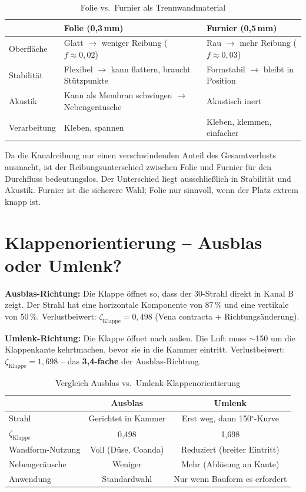 \documentclass[11pt,a4paper]{article}
\begin{document}
\begin{table}[H]
\centering\small
\begin{tabular}{l p{50mm} p{50mm}}
\toprule
& \textbf{Folie (0,3\,mm)} & \textbf{Furnier (0,5\,mm)} \\
\midrule
Oberfläche & Glatt $\rightarrow$ weniger Reibung ($f \approx 0{,}02$) & Rau $\rightarrow$ mehr Reibung ($f \approx 0{,}03$) \\
Stabilität & Flexibel $\rightarrow$ kann flattern, braucht Stützpunkte & Formstabil $\rightarrow$ bleibt in Position \\
Akustik & Kann als Membran schwingen $\rightarrow$ Nebengeräusche & Akustisch inert \\
Verarbeitung & Kleben, spannen & Kleben, klemmen, einfacher \\
\bottomrule
\end{tabular}
\caption{Folie vs.\ Furnier als Trennwandmaterial}
\end{table}

Da die Kanalreibung nur einen verschwindenden Anteil des Gesamtverlusts ausmacht, ist der Reibungsunterschied zwischen Folie und Furnier für den Durchfluss bedeutungslos. Der Unterschied liegt ausschließlich in Stabilität und Akustik. Furnier ist die sicherere Wahl; Folie nur sinnvoll, wenn der Platz extrem knapp ist.

\section{Klappenorientierung -- Ausblas oder Umlenk?}

\textbf{Ausblas-Richtung:} Die Klappe öffnet so, dass der 30\textdegree{}-Strahl direkt in Kanal B zeigt. Der Strahl hat eine horizontale Komponente von 87\,\% und eine vertikale von 50\,\%. Verlustbeiwert: $\zeta_\text{Klappe} = 0{,}498$ (Vena contracta + Richtungsänderung).

\textbf{Umlenk-Richtung:} Die Klappe öffnet nach außen. Die Luft muss $\sim$150\textdegree{} um die Klappenkante kehrtmachen, bevor sie in die Kammer eintritt. Verlustbeiwert: $\zeta_\text{Klappe} = 1{,}698$ -- das \textbf{3{,}4-fache} der Ausblas-Richtung.

\begin{table}[H]
\centering\small
\begin{tabular}{l c c}
\toprule
& \textbf{Ausblas} & \textbf{Umlenk} \\
\midrule
Strahl & Gerichtet in Kammer & Erst weg, dann 150${}^\circ$-Kurve \\
$\zeta_\text{Klappe}$ & 0{,}498 & 1{,}698 \\
Wandform-Nutzung & Voll (Düse, Coanda) & Reduziert (breiter Eintritt) \\
Nebengeräusche & Weniger & Mehr (Ablösung an Kante) \\
Anwendung & Standardwahl & Nur wenn Bauform es erfordert \\
\bottomrule
\end{tabular}
\caption{Vergleich Ausblas vs.\ Umlenk-Klappenorientierung}
\end{table}
\end{document}
